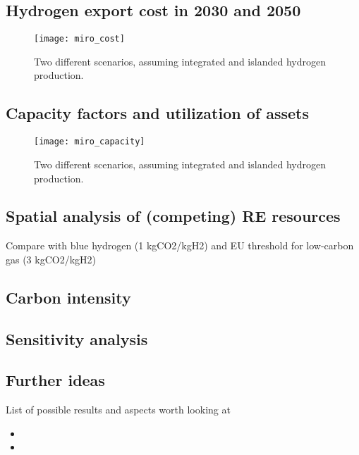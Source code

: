 \subsection{Hydrogen export cost in 2030 and 2050}

\begin{figure}[h!]
    \centering
    \texttt{[image: miro\_cost]}
    \caption{Two different scenarios, assuming integrated and islanded hydrogen production.}
    \label{fig:results_costs}
\end{figure}


\subsection{Capacity factors and utilization of assets}

\begin{figure}[h!]
    \centering
    \texttt{[image: miro\_capacity]}
    \caption{Two different scenarios, assuming integrated and islanded hydrogen production.}
    \label{fig:results_capacity}
\end{figure}

\subsection{Spatial analysis of (competing) RE resources}
Compare with blue hydrogen (1 kgCO2/kgH2) and EU threshold for low-carbon gas (3 kgCO2/kgH2)
\subsection{Carbon intensity}
\subsection{Sensitivity analysis}
\subsection{Further ideas}
List of possible results and aspects worth looking at
\begin{itemize}
    \item
    \item 
\end{itemize}